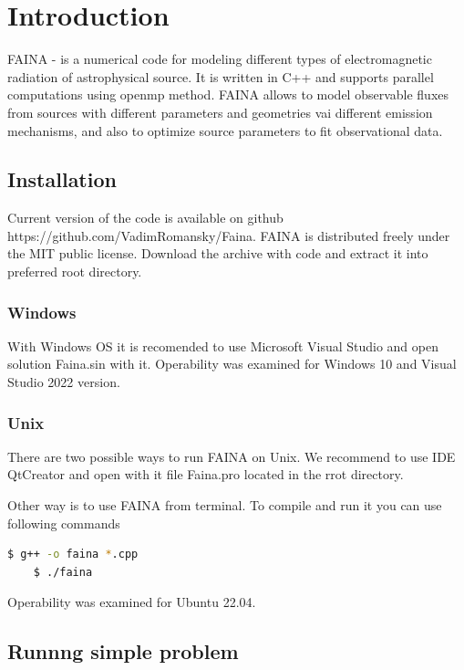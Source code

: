 \chapter*{Introduction}		
FAINA - is a numerical code for modeling different types of electromagnetic radiation of astrophysical source. It is written in C++ and supports parallel computations using openmp method. FAINA allows to model observable fluxes from sources with different parameters and geometries vai different emission mechanisms, and also to optimize source parameters to fit observational data.

\section*{Installation}
Current version of the code is available on github https://github.com/VadimRomansky/Faina. FAINA is distributed freely under the MIT public license. Download the archive with code and extract it into preferred root directory.

\subsection*{Windows}
With Windows OS it is recomended to use Microsoft Visual Studio and open solution Faina.sin with it. Operability was examined for Windows 10 and Visual Studio 2022 version.

\subsection*{Unix}
There are two possible ways to run FAINA on Unix. We recommend to use IDE QtCreator and open  with it file Faina.pro located in the rrot directory.

Other way is to use FAINA from terminal. To compile and run it you can use following commands

\begin{lstlisting}[language=bash]
	$ g++ -o faina *.cpp
	$ ./faina
\end{lstlisting}

Operability was examined for Ubuntu 22.04.

\section*{Runnng simple problem}\label{running}

